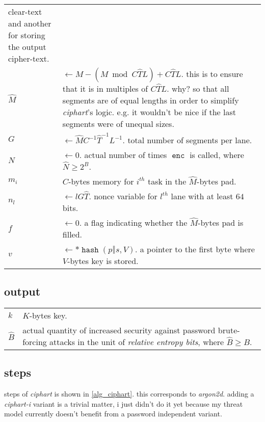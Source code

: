\documentclass[twocolumn]{article}
\DeclareMathOperator{\enc}{\mathtt{enc}}
\DeclareMathOperator{\hash}{\mathtt{hash}}
\begin{document}
\begin{tabularx}{\columnwidth}{lX}
                    clear-text and another for storing the output
                    cipher-text.\\
    $\hat M$    & $\gets M - (M \bmod C\hat TL) + C\hat TL$.  this is to
                    ensure that it is in multiples of $C\hat TL$.  why?  so
                    that all segments are of equal lengths in order to
                    simplify \emph{ciphart}'s logic.  e.g. it wouldn't be
                    nice if the last segments were of unequal sizes.\\
    $G$         & $\gets \hat MC^{-1}\hat T^{-1}L^{-1}$.  total number of
                    segments per lane.\\
    $N$    & $\gets 0$.  actual number of times $\enc$ is called,
                    where $\hat N \ge 2^B$.\\
    $m_i$       & $C$-bytes memory for $i^{th}$ task in the $\hat M$-bytes
                    pad.\\
    $n_l$       & $\gets lG\hat T$.  nonce variable for $l^{th}$ lane with
                    at least $64$ bits.\\
    $f$         & $\gets 0$.  a flag indicating whether the $\hat M$-bytes
                    pad is filled.\\
    $v$         & $\gets *\hash(p \mathbin\Vert s, V)$.  a pointer to the
                    first byte where $V$-bytes key is stored.\\
\end{tabularx}

\subsection{output}
\begin{tabularx}{\columnwidth}{lX}
$k$ & $K$-bytes key.\\
$\hat B$ & actual quantity of increased security against password
            brute-forcing attacks in the unit of \emph{relative entropy
            bits}, where $\hat B \ge B$.\\
\end{tabularx}

\subsection{steps}
steps of \emph{ciphart} is shown in \cref{alg_ciphart}.  this corresponds
to \emph{argon2d}.  adding a \emph{ciphart-i} variant is a trivial matter,
i just didn't do it yet because my threat model currently doesn't benefit
from a password independent variant.
\end{document}
